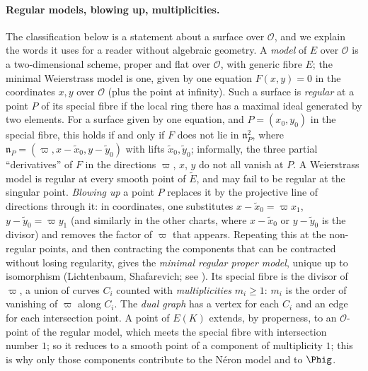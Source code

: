 \paragraph{Regular models, blowing up, multiplicities.} The classification below is a statement about a surface over
$\mathcal O$, and we explain the words it uses for a reader without algebraic geometry. A \emph{model} of $E$ over $\mathcal O$ is a
two-dimensional scheme, proper and flat over $\mathcal O$, with generic fibre $E$; the minimal Weierstrass model is one, given by
one equation $F(x,y)=0$ in the coordinates $x,y$ over $\mathcal O$ (plus the point at infinity). Such a surface is
\emph{regular} at a point $P$ of its special fibre if the local ring there has a maximal ideal generated by two elements. For
a surface given by one equation, and $P=(x_0,y_0)$ in the special fibre, this holds if and only if $F$ does not lie in
$\mathfrak n_P^2$, where $\mathfrak n_P=(\varpi,x-\tilde x_0,y-\tilde y_0)$ with lifts $\tilde x_0,\tilde y_0$; informally, the three
partial ``derivatives'' of $F$ in the directions $\varpi$, $x$, $y$ do not all vanish at $P$. A Weierstrass model is regular at
every smooth point of $\tilde E$, and may fail to be regular at the singular point. \emph{Blowing up} a point $P$ replaces it by
the projective line of directions through it: in coordinates, one substitutes $x-\tilde x_0=\varpi x_1$, $y-\tilde y_0=\varpi y_1$
(and similarly in the other charts, where $x-\tilde x_0$ or $y-\tilde y_0$ is the divisor) and removes the factor of $\varpi$ that
appears. Repeating this at the non-regular points, and then contracting the components that can be contracted without
losing regularity, gives the \emph{minimal regular proper model}, unique up to isomorphism (Lichtenbaum, Shafarevich; see
\cite[IV.7]{SilvermanATAEC}). Its special fibre is the divisor of $\varpi$, a union of curves $C_i$ counted with
\emph{multiplicities} $m_i\ge1$: $m_i$ is the order of vanishing of $\varpi$ along $C_i$. The \emph{dual graph} has a vertex for each
$C_i$ and an edge for each intersection point. A point of $E(K)$ extends, by properness, to an $\mathcal O$-point of the regular model, which meets the special fibre with
intersection number $1$; so it reduces to a smooth point of a component of multiplicity $1$; this is why only those components
contribute to the N\'eron model and to $\Phig$.

